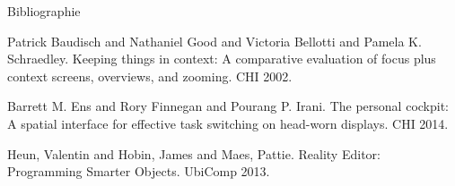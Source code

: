 \begin{frame}[allowframebreaks]{Bibliographie}
  \begin{thebibliography}{10}
      Patrick Baudisch and Nathaniel Good and Victoria Bellotti and Pamela K. Schraedley.
      \newblock Keeping things in context: A comparative evaluation of focus plus context screens, overviews, and zooming.
      \newblock CHI 2002.

      Barrett M. Ens and Rory Finnegan and Pourang P. Irani.
      \newblock The personal cockpit: A spatial interface for effective task switching on head-worn displays.
      \newblock CHI 2014.

      Heun, Valentin and Hobin, James and Maes, Pattie.
      \newblock Reality Editor: Programming Smarter Objects.
      \newblock UbiComp 2013.
  \end{thebibliography}
\end{frame}